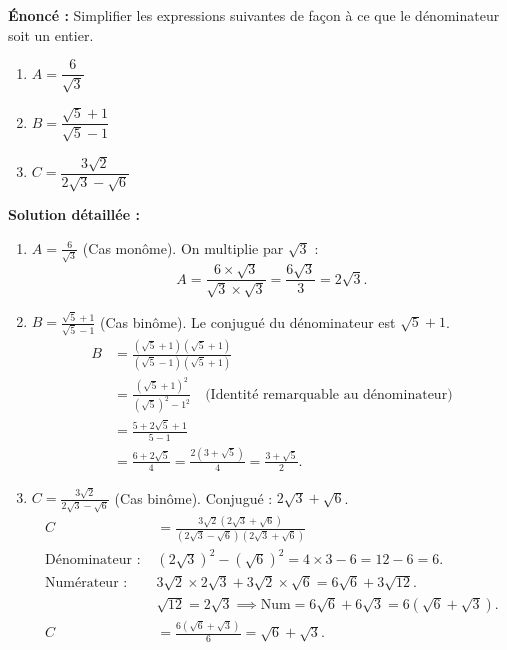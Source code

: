 \documentclass[11pt]{article}
\begin{document}
\begin{exoresolu}
\textbf{Énoncé :} Simplifier les expressions suivantes de façon à ce que le dénominateur soit un entier.
\begin{enumerate}
    \item $A = \dfrac{6}{\sqrt{3}}$
    \item $B = \dfrac{\sqrt{5}+1}{\sqrt{5}-1}$
    \item $C = \dfrac{3\sqrt{2}}{2\sqrt{3}-\sqrt{6}}$
\end{enumerate}
\tcblower
\textbf{Solution détaillée :}
\begin{enumerate}
    \item \textbf{$A = \frac{6}{\sqrt{3}}$} (Cas monôme). On multiplie par $\sqrt{3}$ :
    \[ A = \frac{6 \times \sqrt{3}}{\sqrt{3} \times \sqrt{3}} = \frac{6\sqrt{3}}{3} = \boxed{2\sqrt{3}}. \]
    \item \textbf{$B = \frac{\sqrt{5}+1}{\sqrt{5}-1}$} (Cas binôme). Le conjugué du dénominateur est $\sqrt{5}+1$.
    \begin{align*}
    B &= \frac{(\sqrt{5}+1)(\sqrt{5}+1)}{(\sqrt{5}-1)(\sqrt{5}+1)} \\
      &= \frac{(\sqrt{5}+1)^2}{(\sqrt{5})^2 - 1^2} \quad \text{(Identité remarquable au dénominateur)} \\
      &= \frac{5 + 2\sqrt{5} + 1}{5 - 1} \\
      &= \frac{6 + 2\sqrt{5}}{4} = \frac{2(3+\sqrt{5})}{4} = \boxed{\frac{3+\sqrt{5}}{2}}.
    \end{align*}
    \item \textbf{$C = \frac{3\sqrt{2}}{2\sqrt{3}-\sqrt{6}}$} (Cas binôme). Conjugué : $2\sqrt{3}+\sqrt{6}$.
    \begin{align*}
    C &= \frac{3\sqrt{2}(2\sqrt{3}+\sqrt{6})}{(2\sqrt{3}-\sqrt{6})(2\sqrt{3}+\sqrt{6})} \\
      \text{Dénominateur : } & (2\sqrt{3})^2 - (\sqrt{6})^2 = 4\times 3 - 6 = 12 - 6 = 6. \\
      \text{Numérateur : } & 3\sqrt{2} \times 2\sqrt{3} + 3\sqrt{2} \times \sqrt{6} = 6\sqrt{6} + 3\sqrt{12}. \\
      & \sqrt{12} = 2\sqrt{3} \implies \text{Num} = 6\sqrt{6} + 6\sqrt{3} = 6(\sqrt{6}+\sqrt{3}). \\
      C &= \frac{6(\sqrt{6}+\sqrt{3})}{6} = \boxed{\sqrt{6}+\sqrt{3}}.
    \end{align*}
\end{enumerate}
\end{exoresolu}
\end{document}
